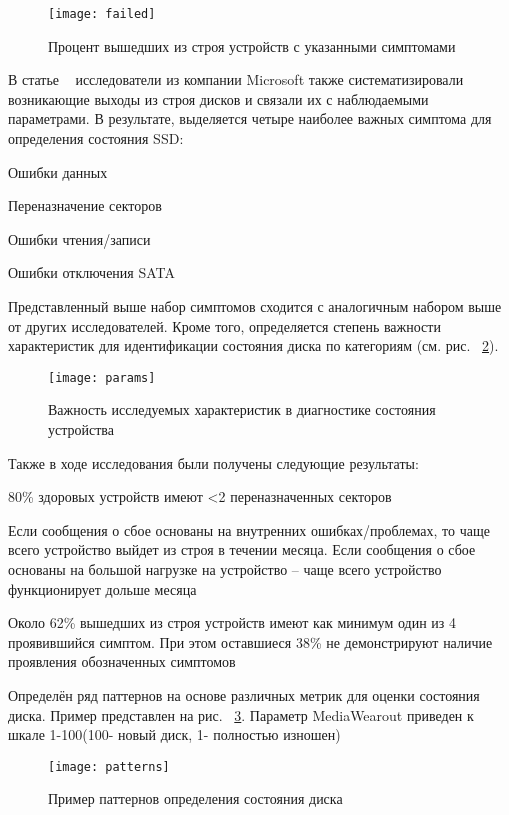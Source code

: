 \begin{figure}[h]
	\centering
	\texttt{[image: failed]}
	\caption{Процент вышедших из строя устройств 
с указанными симптомами}
	\label{fig:failed}
\end{figure}

В статье ~\cite{faildatacenter} исследователи из компании Microsoft также систематизировали возникающие выходы из строя дисков и связали их с наблюдаемыми параметрами. 
В результате, выделяется четыре наиболее важных симптома для определения состояния SSD:
\begin{itemize*}
	\item{Ошибки данных}
    \item{Переназначение секторов}
    \item{Ошибки чтения/записи}
    \item{Ошибки отключения SATA}
\end{itemize*}
Представленный выше набор симптомов сходится с аналогичным набором выше от других исследователей. 
Кроме того, определяется степень важности характеристик для идентификации состояния диска по категориям (см. рис. ~\ref{fig:params}). 
\begin{figure}[!h]
	\centering
	\texttt{[image: params]}
	\caption{Важность исследуемых характеристик в 
		диагностике состояния устройства}
	\label{fig:params}
\end{figure}

Также в ходе исследования были получены следующие результаты:
\begin{itemize*}
	\item{80\% здоровых устройств имеют <2 переназначенных секторов}
    \item{Если сообщения о сбое основаны на внутренних ошибках/проблемах, то чаще всего устройство выйдет из строя в течении месяца. Если сообщения о сбое основаны на большой нагрузке на устройство – чаще всего устройство функционирует дольше месяца}
    \item{Около 62\% вышедших из строя устройств имеют как минимум один из 4 проявившийся симптом. При этом оставшиеся 38\% не демонстрируют наличие проявления обозначенных симптомов} 
    \item{Определён ряд паттернов на основе различных метрик для оценки состояния диска. Пример представлен на рис. ~\ref{fig:patterns}. Параметр MediaWearout приведен к шкале 1-100(100- новый диск, 1- полностью изношен)}
\end{itemize*}

\begin{figure}[h]
	\centering
	\texttt{[image: patterns]}
	\caption{Пример паттернов определения состояния диска}
	\label{fig:patterns}
\end{figure}
 

